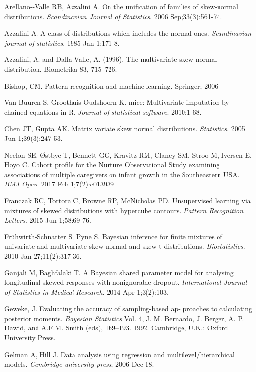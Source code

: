 \documentclass[useAMS,referee]{biom}
\begin{document}
\begin{thebibliography}{}

\bibitem{ } Arellano‐-Valle RB, Azzalini A. On the unification of families of skew‐normal distributions. \textit{Scandinavian Journal of Statistics}. 2006 Sep;33(3):561-74.

\bibitem{ } Azzalini A. A class of distributions which includes the normal ones. \textit{Scandinavian journal of statistics}. 1985 Jan 1:171-8.

\bibitem{ } Azzalini, A. and Dalla Valle, A. (1996). The multivariate skew normal distribution. Biometrika 83, 715–726.

\bibitem{ } Bishop, CM. Pattern recognition and machine learning. Springer; 2006.

\bibitem{ } Van Buuren S, Groothuis-Oudshoorn K. mice: Multivariate imputation by chained equations in R. \textit{Journal of statistical software}. 2010:1-68.

\bibitem{ } Chen JT, Gupta AK. Matrix variate skew normal distributions. \textit{Statistics}. 2005 Jun 1;39(3):247-53.

\bibitem{ } Neelon SE, \O stbye T, Bennett GG, Kravitz RM, Clancy SM, Stroo M, Iversen E, Hoyo C. Cohort profile for the Nurture Observational Study examining associations of multiple caregivers on infant growth in the Southeastern USA. \textit{BMJ Open}. 2017 Feb 1;7(2):e013939.

\bibitem{ } Franczak BC, Tortora C, Browne RP, McNicholas PD. Unsupervised learning via mixtures of skewed distributions with hypercube contours. \textit{Pattern Recognition Letters}. 2015 Jun 1;58:69-76.

\bibitem{ } Fr\"{u}hwirth-Schnatter S, Pyne S. Bayesian inference for finite mixtures of univariate and multivariate skew-normal and skew-t distributions. \textit{Biostatistics}. 2010 Jan 27;11(2):317-36.

\bibitem{ } Ganjali M, Baghfalaki T. A Bayesian shared parameter model for analysing longitudinal skewed responses with nonignorable dropout. \textit{International Journal of Statistics in Medical Research}. 2014 Apr 1;3(2):103.

\bibitem{ } Geweke, J. Evaluating the accuracy of sampling-based ap- proaches to calculating posterior moments. \textit{Bayesian Statistics} Vol. 4, J. M. Bernardo, J. Berger, A. P. Dawid, and A.F.M. Smith (eds), 169–193. 1992. Cambridge, U.K.: Oxford University Press.

\bibitem{ } Gelman A, Hill J. Data analysis using regression and multilevel/hierarchical models. \textit{Cambridge university press}; 2006 Dec 18.


\end{thebibliography}
\end{document}
